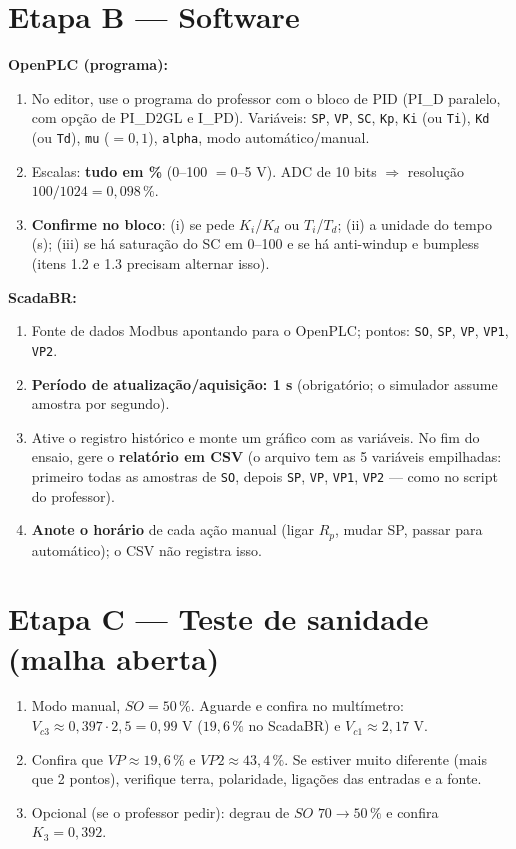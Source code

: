 \documentclass[11pt,a4paper]{article}
\newcommand{\Vc}[1]{V_{c#1}}
\begin{document}
\section{Etapa B --- Software}
\textbf{OpenPLC (programa):}
\begin{enumerate}
\item No editor, use o programa do professor com o bloco de PID (PI\_D paralelo, com opção de PI\_D2GL e I\_PD). Variáveis: \texttt{SP}, \texttt{VP}, \texttt{SC}, \texttt{Kp}, \texttt{Ki} (ou \texttt{Ti}), \texttt{Kd} (ou \texttt{Td}), \texttt{mu} ($=0{,}1$), \texttt{alpha}, modo automático/manual.
\item Escalas: \textbf{tudo em \%} (0--100 $=0$--5 V). ADC de 10 bits $\Rightarrow$ resolução $100/1024=0{,}098\,\%$.
\item \textbf{Confirme no bloco}: (i) se pede $K_i$/$K_d$ ou $T_i$/$T_d$; (ii) a unidade do tempo (s); (iii) se há saturação do SC em 0--100 e se há anti-windup e bumpless (itens 1.2 e 1.3 precisam alternar isso).
\end{enumerate}
\textbf{ScadaBR:}
\begin{enumerate}
\item Fonte de dados Modbus apontando para o OpenPLC; pontos: \texttt{SO}, \texttt{SP}, \texttt{VP}, \texttt{VP1}, \texttt{VP2}.
\item \textbf{Período de atualização/aquisição: 1 s} (obrigatório; o simulador assume amostra por segundo).
\item Ative o registro histórico e monte um gráfico com as variáveis. No fim do ensaio, gere o \textbf{relatório em CSV} (o arquivo tem as 5 variáveis empilhadas: primeiro todas as amostras de \texttt{SO}, depois \texttt{SP}, \texttt{VP}, \texttt{VP1}, \texttt{VP2} --- como no script do professor).
\item \textbf{Anote o horário} de cada ação manual (ligar $R_p$, mudar SP, passar para automático); o CSV não registra isso.
\end{enumerate}

\section{Etapa C --- Teste de sanidade (malha aberta)}
\begin{enumerate}
\item Modo manual, $SO=50\,\%$. Aguarde e confira no multímetro: $\Vc3\approx0{,}397\cdot2{,}5=0{,}99$ V ($19{,}6\,\%$ no ScadaBR) e $\Vc1\approx2{,}17$ V.
\item Confira que $VP\approx19{,}6\,\%$ e $VP2\approx43{,}4\,\%$. Se estiver muito diferente (mais que 2 pontos), verifique terra, polaridade, ligações das entradas e a fonte.
\item Opcional (se o professor pedir): degrau de $SO$ $70\to50\,\%$ e confira $K_3=0{,}392$.
\end{enumerate}
\end{document}
